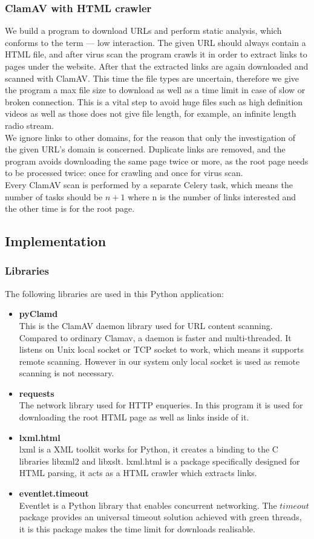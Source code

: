 \subsubsection{ClamAV with HTML crawler}
We build a program to download URLs and perform static analysis, which 
conforms to the term --- low interaction. The given URL should always contain 
a HTML file, and after virus scan the program crawls it in order to extract links to pages 
under the website. After that the extracted links are again downloaded and 
scanned with ClamAV. This time the file types are uncertain, therefore we give 
the program a max file size to download as well as a time limit in case of 
slow or broken connection. This is a vital step to avoid huge files such as 
high definition videos as well as those does not give file length, for example, an 
infinite length radio stream. \\
We ignore links to other domains, for the reason that only the investigation 
of the given URL's domain is concerned. Duplicate links are removed, and the 
program avoids downloading the same page twice or more, as the root page needs 
to be processed twice: once for crawling and once for virus scan. \\
Every ClamAV scan is performed by a separate Celery task, which means the 
number of tasks should be $n+1$ where n is the number of links interested and 
the other time is for the root page.  

\subsection{Implementation}
\subsubsection{Libraries}
The following libraries are used in this Python application:
\begin{itemize}
\item {\bf pyClamd}\\This is the ClamAV daemon library used for URL content 
scanning. Compared to ordinary Clamav, a daemon is faster and 
multi-threaded. It listens on Unix local socket or TCP socket to work, which 
means it supports remote scanning. However in our system only local socket is 
used as remote scanning is not necessary. 
\item {\bf requests}\\The network library used for HTTP enqueries. In this 
program it is used for downloading the root HTML page as well as links inside 
of it. 
\item {\bf lxml.html}\\lxml is a XML toolkit works for Python, it creates a 
binding to the C libraries libxml2 and libxslt.\cite{lxml} lxml.html is a 
package specifically designed for HTML parsing, it acts as a HTML crawler 
which extracts links. 
\item {\bf eventlet.timeout}\\Eventlet is a Python library that enables 
concurrent networking. The $timeout$ package provides an universal timeout 
solution achieved with green threads, it is this package makes the time limit 
for downloads realisable. 
\end{itemize}
